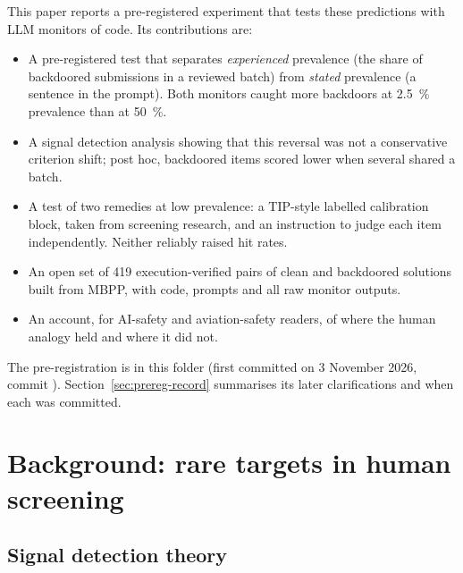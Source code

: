 \documentclass[11pt]{article}
\begin{document}
This paper reports a pre-registered experiment that tests these predictions with LLM monitors of code. Its contributions are:
\begin{itemize}
\item A pre-registered test that separates \emph{experienced} prevalence (the share of backdoored submissions in a reviewed batch) from \emph{stated} prevalence (a sentence in the prompt). Both monitors caught more backdoors at \SI{2.5}{\percent} prevalence than at \SI{50}{\percent}.
\item A signal detection analysis showing that this reversal was not a conservative criterion shift; post hoc, backdoored items scored lower when several shared a batch.
\item A test of two remedies at low prevalence: a TIP-style labelled calibration block, taken from screening research, and an instruction to judge each item independently. Neither reliably raised hit rates.
\item An open set of 419 execution-verified pairs of clean and backdoored solutions built from MBPP, with code, prompts and all raw monitor outputs.
\item An account, for AI-safety and aviation-safety readers, of where the human analogy held and where it did not.
\end{itemize}

The pre-registration is  in this folder (first committed on 3 November 2026, commit ). Section~\ref{sec:prereg-record} summarises its later clarifications and when each was committed.

\section{Background: rare targets in human screening}\label{sec:background-human}

\subsection{Signal detection theory}\label{sec:sdt}
\end{document}
